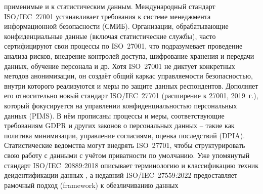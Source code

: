 применимые и к статистическим данным. Международный стандарт ISO/IEC 27001 устанавливает требования к системе менеджмента информационной безопасности (СМИБ). Организации, обрабатывающие конфиденциальные данные (включая статистические службы), часто сертифицируют свои процессы по ISO 27001, что подразумевает проведение анализа рисков, внедрение контролей доступа, шифрование хранения и передачи данных, обучение персонала и др. Хотя ISO 27001 не диктует конкретных методов анонимизации, он создаёт общий каркас управляемости безопасностью, внутри которого реализуются и меры по защите данных респондентов. Дополняет его относительно новый стандарт ISO/IEC 27701 (расширение к 27001, 2019 г.), который фокусируется на управлении конфиденциальностью персональных данных (PIMS). В нём прописаны процессы и меры, соответствующие требованиям GDPR и других законов о персональных данных – такие как политика минимизации, управление согласиями, оценка последствий (DPIA). Статистические ведомства могут внедрять ISO 27701, чтобы структурировать свою работу с данными с учётом приватности по умолчанию. Уже упомянутый стандарт ISO/IEC 20889:2018 описывает терминологию и классификацию техник деидентификации данных
\autocite{iapp-org}
, а недавний ISO/IEC 27559:2022 предоставляет рамочный подход (framework) к обезличиванию данных
\autocite{iapp-org}
